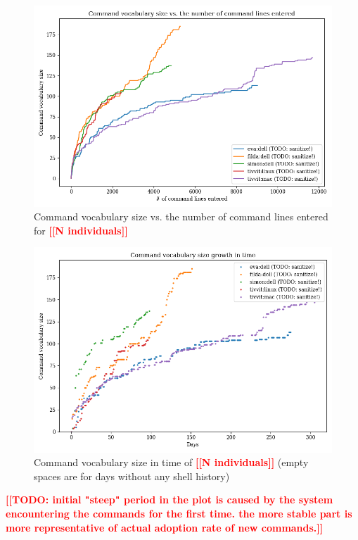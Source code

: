 \documentclass[thesis=M,english]{FITthesis}[2012/10/20]
\newcommand{\todotext}[1]{\textcolor{red}{\textbf{[[#1]]}}}
\newcommand{\tmpframe}[1]{\fbox{#1}}
\renewcommand{\tmpframe}[1]{#1}
\begin{document}
\begin{figure}
  \tmpframe{\includegraphics[width=\linewidth]{figures/greenberg_new/plot_cmd-vocab-size.png}}
  \caption{Command vocabulary size vs. the number of command
lines entered for \todotext{N individuals}}
\end{figure}

\begin{figure}
  \tmpframe{\includegraphics[width=\linewidth]{figures/greenberg_new/plot_cmd-vocab-size-time.png}}
  \caption{Command vocabulary size in time of \todotext{N individuals} (empty spaces are for days without any shell history)}
\end{figure}




\todotext{TODO: initial "steep" period in the plot is caused by the system encountering the commands for the first time. the more stable part is more representative of actual adoption rate of new commands.}
\end{document}
